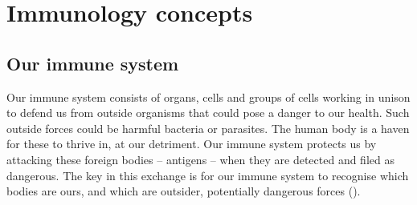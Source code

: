 \documentclass{l4proj}
\begin{document}
\section{Immunology concepts}

\subsection{Our immune system} \label{bg:immunesystem}

Our immune system consists of organs, cells and groups of cells working in unison to defend us from outside organisms that could pose a danger to our health. Such outside forces could be harmful bacteria or parasites. The human body is a haven for these to thrive in, at our detriment. Our immune system protects us by attacking these foreign bodies – antigens – when they are detected and filed as dangerous. The key in this exchange is for our immune system to recognise which bodies are ours, and which are outsider, potentially dangerous forces (\cite{http://www.imgt.org/IMGTeducation/Tutorials/ImmuneSystem/UK/the_immune_system.pdf}).
\end{document}
